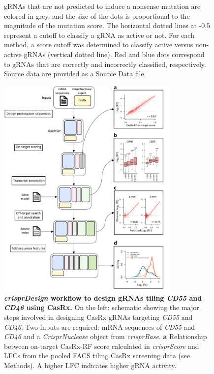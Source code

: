 \documentclass[pdftex,english,10pt]{article}
\begin{document}
{\begin{figure}
{ gRNAs that are not predicted to induce a nonsense mutation are colored in grey, and the size of the dots is proportional to the magnitude of the mutation score. The horizontal dotted lines at -0.5 represent a cutoff to classify a gRNA as active or not. For each method, a score cutoff was determined to classify active versus non-active gRNAs (vertical dotted line). Red and blue dots correspond to gRNAs that are correctly and incorrectly classified, respectively. Source data are provided as a Source Data file. }
  \label{fig:crisprbe}
\end{figure}





\begin{figure}
\centering
\includegraphics[width=0.8\textwidth]{Figure5.pdf}
  \caption{\textbf{\textit{crisprDesign} workflow to design gRNAs tiling \textit{CD55} and \textit{CD46} using CasRx.} 
  On the left: schematic showing the major steps involved in designing CasRx gRNAs targeting \textit{CD55} and \textit{CD46}.
Two inputs are required: mRNA sequences of \textit{CD55} and \textit{CD46} and a 
\textit{CrisprNuclease} object from \textit{crisprBase}. 
\textbf{a} Relationship between on-target CasRx-RF score calculated in \textit{crisprScore} and LFCs from the pooled FACS tiling CasRx screening data (see Methods). A higher LFC indicates higher gRNA activity.
}
\end{figure}}
\end{document}

